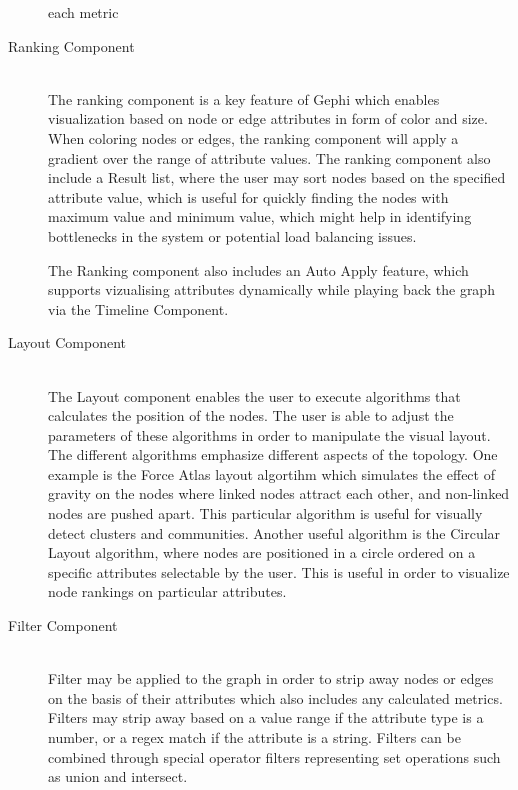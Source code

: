 \begin{description}
    each metric

\item[Ranking Component] \hfill \\

    The ranking component is a key feature of Gephi which enables
    visualization based on node or edge attributes in form of color
    and size. When coloring nodes or edges, the ranking component
    will apply a gradient over the range of attribute values. The
    ranking component also include a Result list, where the user may
    sort nodes based on the specified attribute value, which is
    useful for quickly finding the nodes with maximum value and
    minimum value, which might help in identifying bottlenecks in
    the system or potential load balancing issues.

    The Ranking component also includes an Auto Apply feature, which
    supports vizualising attributes dynamically while playing back the
    graph via the Timeline Component.

\item[Layout Component] \hfill \\

    The Layout component enables the user to execute algorithms that
    calculates the position of the nodes. The user is able to adjust the
    parameters of these algorithms in order to manipulate the visual
    layout. The different algorithms emphasize different aspects of the
    topology. One example is the Force Atlas layout algortihm which
    simulates the effect of gravity on the nodes where linked nodes
    attract each other, and non-linked nodes are pushed apart. This
    particular algorithm is useful for visually detect clusters and
    communities. Another useful algorithm is the Circular Layout
    algorithm, where nodes are positioned in a circle ordered on a
    specific attributes selectable by the user. This is useful in order
    to visualize node rankings on particular attributes.

\item[Filter Component] \hfill \\

    Filter may be applied to the graph in order to strip away nodes or
    edges on the basis of their attributes which also includes any
    calculated metrics. Filters may strip away based on a value range if
    the attribute type is a number, or a regex match if the attribute is
    a string. Filters can be combined through special operator filters
    representing set operations such as union and intersect.


\end{description}
